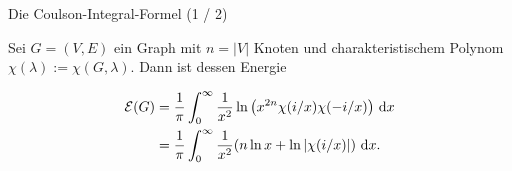 \documentclass[aspectratio = 169]{beamer}
\begin{document}

\begin{frame}{Die Coulson-Integral-Formel (1 / 2)}
    
    \begin{theorem}

        Sei $G = (V, E)$ ein Graph mit $n = |V|$ Knoten und charakteristischem Polynom $\chi(\lambda) := \chi(G, \lambda)$.
        Dann ist dessen Energie

        \begin{align}
            \mathcal E(G)
            & =
            \frac{1}{\pi}
            \int_0^\infty
                \frac{1}{x^2}
                \ln {\left ( x^{2 n} \chi(i/x) \chi(-i/x) \right )}
                ~ \mathrm d x
            \label{eq:Coulson_1} \\
            & =
            \frac{1}{\pi}
            \int_0^\infty
                \frac{1}{x^2}
                {\left ( 
                    n \ln x
                    +
                    \ln |\chi(i/x)|
                 \right )}
                ~ \mathrm d x.
            \label{eq:Coulson_2}
        \end{align}

    \end{theorem}

\end{frame}

\end{document}
